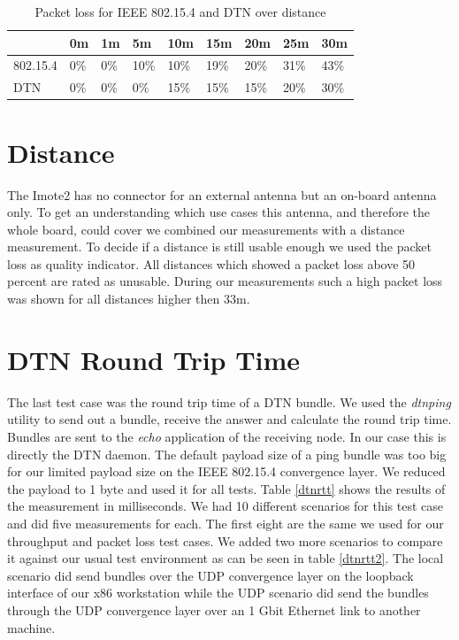 \begin{table}
\begin{tabular}{lllllllll}
    & 0m & 1m & 5m & 10m & 15m & 20m & 25m & 30m \\
\hline
802.15.4 & 0\% & 0\% & 10\% & 10\% & 19\% & 20\% & 31\% & 43\% \\
DTN & 0\% & 0\% & 0\% & 15\% & 15\% & 15\% & 20\% & 30\% \\
\end{tabular}
\caption{Packet loss for IEEE 802.15.4 and DTN over distance}
\label{tableloss}
\end{table}

\section{Distance}
The Imote2 has no connector for an external antenna but an on-board antenna
only. To get an understanding which use cases this antenna, and therefore the
whole board, could cover we combined our measurements with a distance
measurement. To decide if a distance is still usable enough we used the
packet loss as quality indicator. All distances which showed a packet loss above
50 percent are rated as unusable. During our measurements such a high packet loss
was shown for all distances higher then 33m.

\section{DTN Round Trip Time}
The last test case was the round trip time of a DTN bundle. We used the
\emph{dtnping} utility to send out a bundle, receive the answer and calculate
the round trip time. Bundles are sent to the \emph{echo} application of the
receiving node. In our case this is directly the DTN daemon. The default payload
size of a ping bundle was too big for our limited payload size on the IEEE
802.15.4 convergence layer. We reduced the payload to 1 byte and used it for all
tests. Table \ref{dtnrtt} shows the results of the measurement in milliseconds. We
had 10 different scenarios for this test case and did five measurements for each.
The first eight are the same we used for our throughput and packet loss test cases.
We added two more scenarios to compare it against our usual test environment as
can be seen in table \ref{dtnrtt2}. The
local scenario did send bundles over the UDP convergence layer on the loopback
interface of our x86 workstation while the UDP scenario did send the bundles
through the UDP convergence layer over an 1 Gbit Ethernet link to another
machine.

